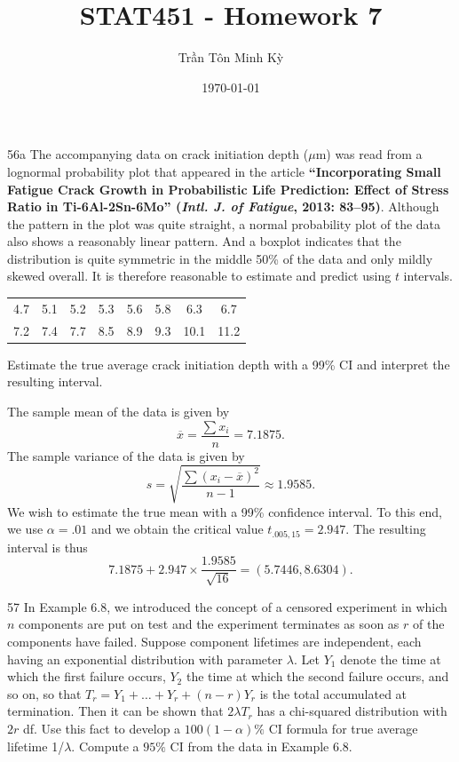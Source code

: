 \documentclass{exam}
\title{STAT451 - Homework 7}
\author{\foreignlanguage{vietnamese}{Trần Tôn Minh Kỳ}}
\date{\today}
\begin{document}
\maketitle
\begin{problem}{56a}
	The accompanying data on crack initiation depth ($\mu$m) was read from a lognormal probability plot that appeared in the article \textbf{``Incorporating Small Fatigue Crack Growth in Probabilistic Life Prediction: Effect of Stress Ratio in Ti-6Al-2Sn-6Mo'' (\textit{Intl. J. of Fatigue}, 2013: 83--95)}. Although the pattern in the plot was quite straight, a normal probability plot of the data also shows a reasonably linear pattern. And a boxplot indicates that the distribution is quite symmetric in the middle 50\% of the data and only mildly skewed overall. It is therefore reasonable to estimate and predict using $t$ intervals.
	\begin{center}
		\bgroup
		\def\arraystretch{1.2}
		\begin{tabular}{cccccccc}
			4.7 & 5.1 & 5.2 & 5.3 & 5.6 & 5.8 & 6.3 & 6.7 \\
			7.2 & 7.4 & 7.7 & 8.5 & 8.9 & 9.3 & 10.1 & 11.2
		\end{tabular}
		\egroup
	\end{center}
	Estimate the true average crack initiation depth with a 99\% CI and interpret the resulting interval.
\end{problem}

The sample mean of the data is given by
\[
	\overline{x} = \frac{\sum x_i}{n} = 7.1875.
\]
The sample variance of the data is given by
\[
	s = \sqrt{\frac{\sum (x_i - \overline{x})^2}{n - 1}} \approx 1.9585.
\]
We wish to estimate the true mean with a 99\% confidence interval. To this end, we use $\alpha = .01$ and we obtain the critical value $t_{.005, 15} = 2.947$. The resulting interval is thus
\[
	7.1875 + 2.947 \times \frac{1.9585}{\sqrt{16}} = (5.7446, 8.6304).
\]
\newpage
\begin{problem}{57}
	In Example 6.8, we introduced the concept of a censored experiment in which $n$ components are put on test and the experiment terminates as soon as $r$ of the components have failed. Suppose component lifetimes are independent, each having an exponential distribution with parameter $\lambda$. Let $Y_1$ denote the time at which the first failure occurs, $Y_2$ the time at which the second failure occurs, and so on, so that $T_r = Y_1 + \dots + Y_r + (n - r)Y_r$ is the total accumulated at termination. Then it can be shown that $2\lambda T_r$ has a chi-squared distribution with $2r$ df. Use this fact to develop a $100(1 - \alpha)\%$ CI formula for true average lifetime 1/$\lambda$. Compute a $95\%$ CI from the data in Example 6.8.
\end{problem}
\end{document}
